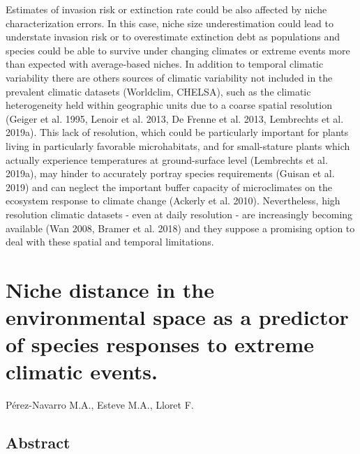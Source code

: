 \documentclass[11pt,twoside]{reedthesis}
\begin{document}
Estimates of invasion risk or extinction rate could be also affected by
niche characterization errors. In this case, niche size underestimation
could lead to understate invasion risk or to overestimate extinction
debt as populations and species could be able to survive under changing
climates or extreme events more than expected with average-based niches.
In addition to temporal climatic variability there are others sources of
climatic variability not included in the prevalent climatic datasets
(Worldclim, CHELSA), such as the climatic heterogeneity held within
geographic units due to a coarse spatial resolution (Geiger et al. 1995,
Lenoir et al. 2013, De Frenne et al. 2013, Lembrechts et al. 2019a).
This lack of resolution, which could be particularly important for
plants living in particularly favorable microhabitats, and for
small-stature plants which actually experience temperatures at
ground-surface level (Lembrechts et al. 2019a), may hinder to accurately
portray species requirements (Guisan et al. 2019) and can neglect the
important buffer capacity of microclimates on the ecosystem response to
climate change (Ackerly et al. 2010). Nevertheless, high resolution
climatic datasets - even at daily resolution - are increasingly becoming
available (Wan 2008, Bramer et al. 2018) and they suppose a promising
option to deal with these spatial and temporal limitations.\par

\chapter[Niche distance as predictor of responses to extreme climatic events]{Niche distance in the environmental space as a predictor of species responses to extreme climatic events.}

\setlength{\parindent}{0pt} Pérez-Navarro M.A., Esteve M.A., Lloret F.
\newpage
\setlength{\parindent}{30pt}

\section*{Abstract}
\end{document}
